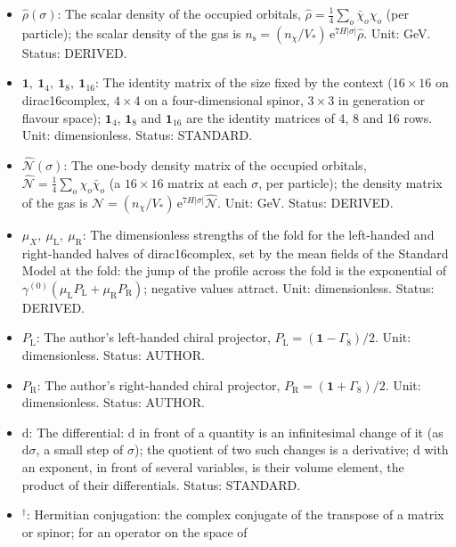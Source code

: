 \documentclass[
  10pt,
]{article}
\begin{document}
\begin{itemize}
\item
  \(\hat\rho(\sigma)\): The scalar density of the occupied orbitals,
  \(\hat\rho = \frac14\sum_o\bar\chi_o\chi_o\) (per particle); the
  scalar density of the gas is
  \(n_{\mathrm{s}} = (n_\chi/V_*)\,\mathrm{e}^{7H\lvert\sigma\rvert}\hat\rho\).
  Unit: GeV. Status: DERIVED.
\item
  \(\mathbf{1},\ \mathbf{1}_4,\ \mathbf{1}_8,\ \mathbf{1}_{16}\): The
  identity matrix of the size fixed by the context (\(16 \times 16\) on
  dirac16complex, \(4 \times 4\) on a four-dimensional spinor,
  \(3 \times 3\) in generation or flavour space); \(\mathbf{1}_4\),
  \(\mathbf{1}_8\) and \(\mathbf{1}_{16}\) are the identity matrices of
  4, 8 and 16 rows. Unit: dimensionless. Status: STANDARD.
\item
  \(\hat{\mathcal{N}}(\sigma)\): The one-body density matrix of the
  occupied orbitals,
  \(\hat{\mathcal{N}} = \frac14\sum_o\chi_o\bar\chi_o\) (a
  \(16 \times 16\) matrix at each \(\sigma\), per particle); the density
  matrix of the gas is
  \(\mathcal{N} = (n_\chi/V_*)\,\mathrm{e}^{7H\lvert\sigma\rvert}\hat{\mathcal{N}}\).
  Unit: GeV. Status: DERIVED.
\item
  \(\mu_X,\ \mu_{\mathrm{L}},\ \mu_{\mathrm{R}}\): The dimensionless
  strengths of the fold for the left-handed and right-handed halves of
  dirac16complex, set by the mean fields of the Standard Model at the
  fold: the jump of the profile across the fold is the exponential of
  \(\gamma^{(0)}(\mu_{\mathrm{L}}P_{\mathrm{L}} + \mu_{\mathrm{R}}P_{\mathrm{R}})\);
  negative values attract. Unit: dimensionless. Status: DERIVED.
\item
  \(P_{\mathrm{L}}\): The author's left-handed chiral projector,
  \(P_{\mathrm{L}} = (\mathbf{1} - \Gamma_8)/2\). Unit: dimensionless.
  Status: AUTHOR.
\item
  \(P_{\mathrm{R}}\): The author's right-handed chiral projector,
  \(P_{\mathrm{R}} = (\mathbf{1} + \Gamma_8)/2\). Unit: dimensionless.
  Status: AUTHOR.
\item
  \(\mathrm{d}\): The differential: \(\mathrm{d}\) in front of a
  quantity is an infinitesimal change of it (as \(\mathrm{d}\sigma\), a
  small step of \(\sigma\)); the quotient of two such changes is a
  derivative; \(\mathrm{d}\) with an exponent, in front of several
  variables, is their volume element, the product of their
  differentials. Status: STANDARD.
\item
  \({}^\dagger\): Hermitian conjugation: the complex conjugate of the
  transpose of a matrix or spinor; for an operator on the space of

\end{itemize}
\end{document}

